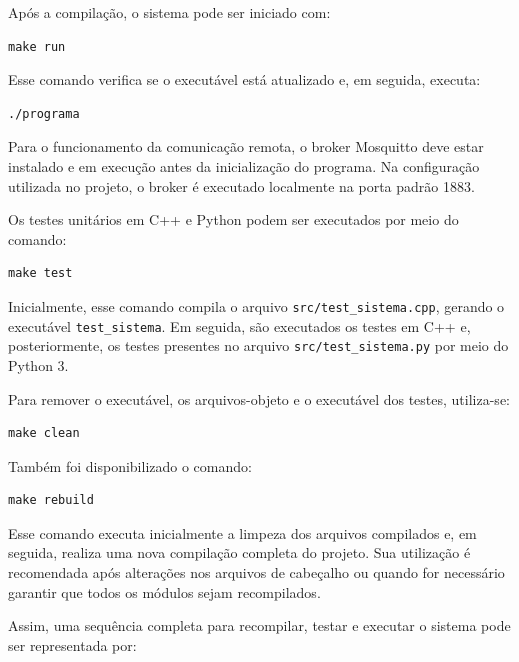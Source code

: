 \documentclass[12pt]{article}
\begin{document}
Após a compilação, o sistema pode ser iniciado com:

\begin{verbatim}
make run
\end{verbatim}

Esse comando verifica se o executável está atualizado e, em seguida, executa:

\begin{verbatim}
./programa
\end{verbatim}

Para o funcionamento da comunicação remota, o broker Mosquitto deve estar instalado e em execução antes da inicialização do programa. Na configuração utilizada no projeto, o broker é executado localmente na porta padrão 1883.

Os testes unitários em C++ e Python podem ser executados por meio do comando:

\begin{verbatim}
make test
\end{verbatim}

Inicialmente, esse comando compila o arquivo \texttt{src/test\_sistema.cpp}, gerando o executável \texttt{test\_sistema}. Em seguida, são executados os testes em C++ e, posteriormente, os testes presentes no arquivo \texttt{src/test\_sistema.py} por meio do Python 3.

Para remover o executável, os arquivos-objeto e o executável dos testes, utiliza-se:

\begin{verbatim}
make clean
\end{verbatim}

Também foi disponibilizado o comando:

\begin{verbatim}
make rebuild
\end{verbatim}

Esse comando executa inicialmente a limpeza dos arquivos compilados e, em seguida, realiza uma nova compilação completa do projeto. Sua utilização é recomendada após alterações nos arquivos de cabeçalho ou quando for necessário garantir que todos os módulos sejam recompilados.

Assim, uma sequência completa para recompilar, testar e executar o sistema pode ser representada por:
\end{document}
